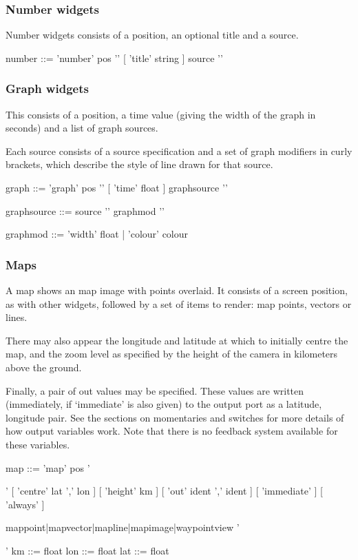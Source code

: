 \subsubsection{Number widgets}
Number widgets consists of a position, an optional title and
a source.
\begin{v}
number      ::= 'number' pos '{' [ 'title' string ] source '}'
\end{v}

\subsubsection{Graph widgets}
This consists of a position, a time value (giving
the width of the graph in seconds) and a list of graph
sources.

Each source consists of a source specification and a set
of graph modifiers in curly brackets, which describe the
style of line drawn for that source.

\begin{v}
graph       ::= 'graph' pos '{' [ 'time' float ] { graphsource } '}'

graphsource ::= source '{' { graphmod } '}'

graphmod    ::= 'width' float 
            |   'colour' colour
\end{v}

\subsubsection{Maps}
A map shows an map image with points overlaid. It consists
of a screen position, as with other widgets,
followed by a set of items to render: map points, vectors or lines.

There may also appear the longitude and latitude at which to initially centre the map,
and the zoom level as specified by the height of the camera in kilometers above the ground.

Finally, a pair of out values may be specified. These values are written (immediately, if `immediate' is also
given) to the output port as a latitude, longitude pair. See the sections on momentaries and switches for
more details of how output variables work. Note that there is no feedback system available for these variables.

\begin{v}
map         ::= 'map' pos '{' 
                    [ 'centre' lat ',' lon ]
                    [ 'height' km ]
                    [ 'out' ident ',' ident ]
                    [ 'immediate' ]
                    [ 'always' ]
                    
                    { mappoint|mapvector|mapline|mapimage|waypointview} 
                '}'
km          ::= float
lon         ::= float
lat         ::= float
\end{v}

